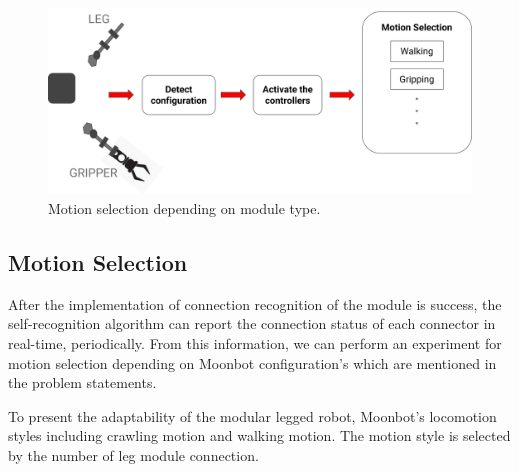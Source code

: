 \begin{figure}[h]
  \centering
  \includegraphics[width=130mm]{./fig/chap3/control_system/leggrip.png}
  \vspace{2mm}
  \caption{Motion selection depending on module type.}\label{gripleg}
\end{figure}

\subsection{Motion Selection}
After the implementation of connection recognition of the module is success, the self-recognition algorithm can report the connection status of each connector in real-time, periodically. From this information, we can perform an experiment for motion selection depending on Moonbot configuration's which are mentioned in the problem statements.

To present the adaptability of the modular legged robot, Moonbot's locomotion styles including crawling motion and walking motion. The motion style is selected by the number of leg module connection.

